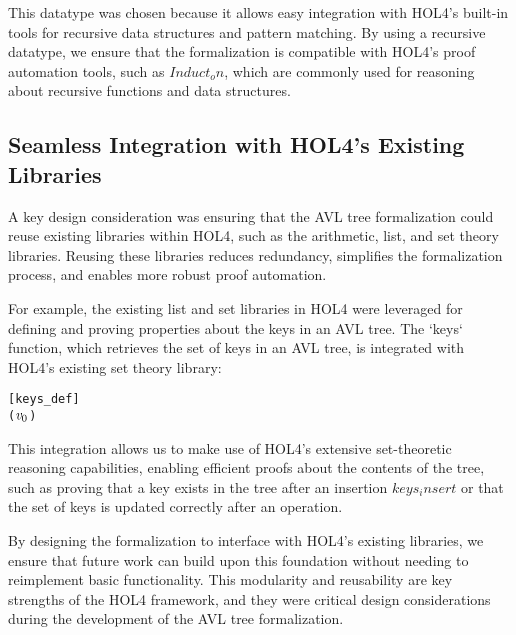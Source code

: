 \documentclass[12pt]{article}
\begin{document}
This datatype was chosen because it allows easy integration with HOL4’s built-in tools for recursive data structures and pattern matching. By using a recursive datatype, we ensure that the formalization is compatible with HOL4's proof automation tools, such as  \( Induct_on \), which are commonly used for reasoning about recursive functions and data structures.

\subsection{Seamless Integration with HOL4’s Existing Libraries}

A key design consideration was ensuring that the AVL tree formalization could reuse existing libraries within HOL4, such as the arithmetic, list, and set theory libraries. Reusing these libraries reduces redundancy, simplifies the formalization process, and enables more robust proof automation.

For example, the existing list and set libraries in HOL4 were leveraged for defining and proving properties about the keys in an AVL tree. The `keys` function, which retrieves the set of keys in an AVL tree, is integrated with HOL4’s existing set theory library:

\begin{alltt}
[keys_def]
  \HOLTokenDefEquality{} \HOLSymConst{\HOLTokenEmpty{}}
 ( \ensuremath{\HOLFreeVar{v}\sb{\mathrm{0}}}    ) \HOLTokenDefEquality{} \HOLTokenLeftbrace{}\HOLTokenRightbrace{} \HOLSymConst{\HOLTokenUnion{}}   \HOLSymConst{\HOLTokenUnion{}}  
\end{alltt}

This integration allows us to make use of HOL4’s extensive set-theoretic reasoning capabilities, enabling efficient proofs about the contents of the tree, such as proving that a key exists in the tree after an insertion \(keys_insert\) or that the set of keys is updated correctly after an operation.

By designing the formalization to interface with HOL4’s existing libraries, we ensure that future work can build upon this foundation without needing to reimplement basic functionality. This modularity and reusability are key strengths of the HOL4 framework, and they were critical design considerations during the development of the AVL tree formalization.
\end{document}
